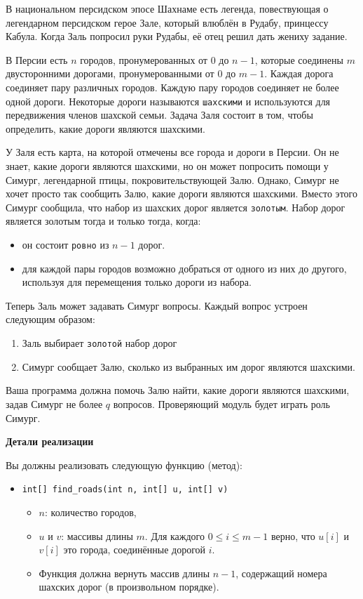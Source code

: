 В национальном персидском эпосе Шахнаме есть легенда, повествующая о легендарном
персидском герое Зале, который влюблён в Рудабу, принцессу Кабула. Когда Заль попросил
руки Рудабы, её отец решил дать жениху задание.

В Персии есть $n$ городов, пронумерованных от $0$ до $n - 1$, которые соединены $m$
двусторонними дорогами, пронумерованными от $0$ до $m - 1$. Каждая дорога соединяет пару
различных городов. Каждую пару городов соединяет не более одной дороги. Некоторые
дороги называются \texttt{шахскими} и используются для передвижения членов шахской семьи.
Задача Заля состоит в том, чтобы определить, какие дороги являются шахскими.

У Заля есть карта, на которой отмечены все города и дороги в Персии. Он не знает, какие
дороги являются шахскими, но он может попросить помощи у Симург, легендарной птицы,
покровительствующей Залю. Однако, Симург не хочет просто так сообщить Залю, какие
дороги являются шахскими. Вместо этого Симург сообщила, что набор из шахских дорог
является \texttt{золотым}. Набор дорог является золотым тогда и только тогда, когда:
\begin{itemize}
\item он состоит \texttt{ровно} из $n - 1$ дорог.
\item для каждой пары городов возможно добраться от одного из них до другого, используя
для перемещения только дороги из набора.
\end{itemize}

Теперь Заль может задавать Симург вопросы. Каждый вопрос устроен следующим образом:
\begin{enumerate}
\item Заль выбирает \texttt{золотой} набор дорог
\item Симург сообщает Залю, сколько из выбранных им дорог являются шахскими.
\end{enumerate}

Ваша программа должна помочь Залю найти, какие дороги являются шахскими, задав Симург
не более $q$ вопросов. Проверяющий модуль будет играть роль Симург.

\textbf{Детали реализации}

Вы должны реализовать следующую функцию (метод):

\begin{itemize}
\item \texttt{int[] find\_roads(int n, int[] u, int[] v)}
\begin{itemize}
\item $n$: количество городов,
\item $u$ и $v$: массивы длины $m$. Для каждого $0 \leq i \leq m - 1$ верно, что $u[i]$ и $v[i]$ это города, соединённые дорогой  $i$.
\item Функция должна вернуть массив длины $n - 1$, содержащий номера шахских дорог (в произвольном порядке).
\end{itemize}
\end{itemize}

